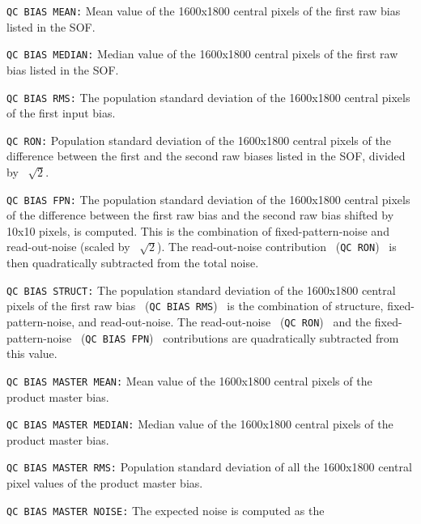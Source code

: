 \begin{description}
\begin{description}

\item {\tt QC BIAS MEAN:} Mean value of the 1600x1800 central pixels of 
                   the first raw bias listed in the SOF.
\item {\tt QC BIAS MEDIAN:} Median value of the 1600x1800 central pixels 
                   of the first raw bias listed in the SOF. 
\item {\tt QC BIAS RMS:} The population standard deviation of the 1600x1800 
                   central pixels of the first input bias.
\item {\tt QC RON:} Population standard deviation of the 1600x1800 central
                   pixels of the difference between the first and the second
                   raw biases listed in the SOF, divided by \ $\sqrt{2}$.
\item {\tt QC BIAS FPN:} The population standard deviation of the 1600x1800 
                   central pixels of the difference between the first raw 
                   bias and the second raw bias shifted by 10x10 pixels, 
                   is computed. This is the combination of fixed-pattern-noise 
                   and read-out-noise (scaled by \ $\sqrt{2}$). 
                   The read-out-noise contribution \ ({\tt QC RON}) \ is 
                   then quadratically subtracted from the total noise.
\item {\tt QC BIAS STRUCT:} The population standard deviation of the 
                   1600x1800 central pixels of the first raw bias 
                   \ ({\tt QC BIAS RMS}) \ is the combination of structure, 
                   fixed-pattern-noise, and read-out-noise. 
                   The read-out-noise \ ({\tt QC RON}) \ and the 
                   fixed-pattern-noise \ ({\tt QC BIAS FPN}) \ 
                   contributions are quadratically subtracted from this value.
\item {\tt QC BIAS MASTER MEAN:} Mean value of the 1600x1800 central pixels 
                   of the product master bias.
\item {\tt QC BIAS MASTER MEDIAN:} Median value of the 1600x1800 central 
                   pixels of the product master bias.
\item {\tt QC BIAS MASTER RMS:} Population standard deviation of all the
                   1600x1800 central pixel values of the product master bias.
\item {\tt QC BIAS MASTER NOISE:} The expected noise is computed as the 

\end{description}
\end{description}
